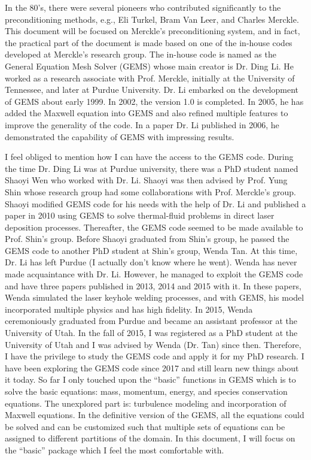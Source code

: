 \documentclass[11pt, letterpaper]{report}
\begin{document}
In the 80's, there were several pioneers who contributed significantly to the preconditioning
methods, e.g., Eli Turkel, Bram Van Leer, and Charles Merckle. This document will be focused on
Merckle's preconditioning system, and in fact, the practical part of the document is made based on
one of the in-house codes developed at Merckle's research group. The in-house code is named as the
General Equation Mesh Solver (GEMS) whose main creator is Dr. Ding Li. He worked as a research
associate with Prof. Merckle, initially at the University of Tennessee, and later at Purdue
University. Dr. Li embarked on the development of GEMS about early 1999. In 2002, the version 1.0 is
completed. In 2005, he has added the Maxwell equation into GEMS and also refined multiple features
to improve the generality of the code. In a paper Dr. Li published in 2006, he demonstrated the
capability of GEMS with impressing results.
\paraspace

I feel obliged to mention how I can have the access to the GEMS code. During the time Dr. Ding Li
was at Purdue university, there was a PhD student named Shaoyi Wen who worked with Dr. Li. Shaoyi
was then advised by Prof. Yung Shin whose research group had some collaborations with Prof.
Merckle's group. Shaoyi modified GEMS code for his needs with the help of Dr. Li and published a
paper in 2010 using GEMS to solve thermal-fluid problems in direct laser deposition processes.
Thereafter, the GEMS code seemed to be made available to Prof. Shin's group. Before Shaoyi graduated
from Shin's group, he passed the GEMS code to another PhD student at Shin's group, Wenda Tan. At
this time, Dr. Li has left Purdue (I actually don't know where he went). Wenda has never made
acquaintance with Dr. Li. However, he managed to exploit the GEMS code and have three papers
published in 2013, 2014 and 2015 with it. In these papers, Wenda simulated the laser keyhole welding
processes, and with GEMS, his model incorporated multiple physics and has high fidelity. In 2015,
Wenda ceremoniously graduated from Purdue and became an assistant professor at the University of
Utah. In the fall of 2015, I was registered as a PhD student at the University of Utah and I was
advised by Wenda (Dr. Tan) since then. Therefore, I have the privilege to study the GEMS code and
apply it for my PhD research. I have been exploring the GEMS code since 2017 and still learn new
things about it today. So far I only touched upon the ``basic'' functions in GEMS which is to solve
the basic equations: mass, momentum, energy, and species conservation equations. The unexplored part
is: turbulence modeling and incorporation of Maxwell equations. In the definitive version of the
GEMS, all the equations could be solved and can be customized such that multiple sets of equations
can be assigned to different partitions of the domain. In this document, I will focus on the
``basic'' package which I feel the most comfortable with.  \paraspace
\end{document}
